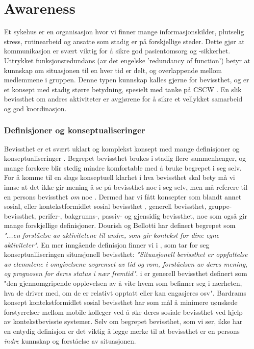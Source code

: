 \section{Awareness}
\label{chp: awareness}

Et sykehus er en organisasjon hvor vi finner mange informasjonskilder, plutselig stress, rutinearbeid og ansatte som stadig er på forskjellige steder. Dette gjør at kommunikasjon er svært viktig for å sikre god pasientomsorg og -sikkerhet\cite{Klemets12}. Uttrykket funksjonsredundans (av det engelske 'redundancy of function') betyr at kunnskap om situasjonen til en hver tid er delt, og overlappende mellom medlemmene i gruppen.\cite{KlemetsRedundancy} Denne typen kunnskap kalles gjerne for bevissthet, og er et konsept med stadig større betydning, spesielt med tanke på CSCW \cite{Dourish92}. En slik bevissthet om andres aktiviteter er avgjørene for å sikre et vellykket samarbeid og god koordinasjon\cite{KlemetsRedundancy}. 

\subsubsection{Definisjoner og konseptualiseringer}

Bevissthet er et svært uklart og komplekst konsept med mange definisjoner og konseptualiseringer \cite{KlemetsRedundancy}\cite{Gutwin04}\cite{Schmidt02}. Begrepet bevissthet brukes i stadig flere sammenhenger, og mange forskere blir stedig mindre komfortable med å bruke begrepet i seg selv. For å komme til en slags konseptuell klarhet i hva bevissthet skal bety må vi innse at det ikke gir mening å se på bevissthet noe i seg selv, men må referere til en persons bevissthet \emph{om} noe \cite{Schmidt02}. Dermed har vi fått konsepter som blandt annet sosial, eller kontekstformidlet sosial bevissthet \cite{Bardram04}, generell bevissthet\cite{Gross13}, gruppe-bevissthet\cite{Gutwin04}, perifer-, bakgrunns-, passiv- og gjensidig bevissthet\cite{Schmidt02}, noe som også gir mange forskjellige definisjoner. Dourish og Bellotti har definert begrepet som \emph{"...en forståelse av aktivitetene til andre, som gir kontekst for dine egne aktiviteter"}. En mer inngående definisjon finner vi i \cite{Endsly95}, som tar for seg konseptualliseringen situasjonell bevissthet: \emph{"Situasjonell bevissthet er oppfattelse av elemntene i omgivelsene avgrenset av tid og rom, forståelsen av deres mening, og prognosen for deres status i nær fremtid"}. i \cite{Gross13} er generell bevissthet definert som "den gjennomgripende opplevelsen av å vite hvem som befinner seg i nærheten, hva de driver med, om de er relativt opptatt eller kan engasjeres osv". Bardrams konsept kontekstformidlet sosial bevissthet har som mål å minimere uønskede forstyrrelser mellom mobile kolleger ved å øke deres sosiale bevissthet ved hjelp av kontekstbevisste systemer\cite{Bardram04}. Selv om begrepet bevissthet, som vi ser, ikke har en entydig definisjon er det viktig å legge merke til at bevissthet er en persons \emph{indre} kunnskap og forståelse av situasjonen.\cite{Gross13} 

